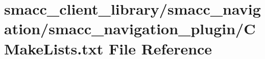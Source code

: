 \hypertarget{client__library_2smacc__navigation_2smacc__navigation__plugin_2CMakeLists_8txt}{}\section{smacc\+\_\+client\+\_\+library/smacc\+\_\+navigation/smacc\+\_\+navigation\+\_\+plugin/\+C\+Make\+Lists.txt File Reference}
\label{client__library_2smacc__navigation_2smacc__navigation__plugin_2CMakeLists_8txt}

